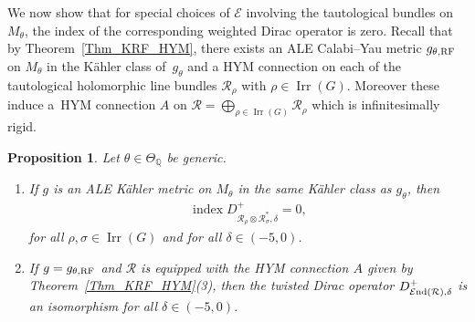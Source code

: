 \documentclass[pdftex]{sigma}
\numberwithin{equation}{section}
\newcommand{\cE}{\mathcal{E}}
\newcommand{\cR}{\mathcal{R}}
\newcommand{\Q}{{\mathbb Q}}
\newcommand{\Irr}{\operatorname{Irr}}
\newcommand{\cEnd}{\cE{\rm nd}}
\newcommand{\ind}{\mathop{\mathrm{index}}}
\newcommand{\RF}{{\rm RF}}
\newtheorem{Proposition}[Theorem]{Proposition}
 { \theoremstyle{definition}
\newtheorem{Definition}[Theorem]{Definition}
\newtheorem{Remark}[Theorem]{Remark} }
\begin{document}
We now show that for special choices of $\cE$ involving the
tautological bundles on $M_\theta$, the index of the corresponding
weighted Dirac operator is zero.  Recall that by Theorem~\ref{Thm_KRF_HYM},
there exists an ALE Calabi--Yau metric $g_{\theta, \RF}$ on $M_\theta$
in the K\"ahler class of~$g_{\theta}$ and a HYM connection on each of
the tautological holomorphic line bundles $\cR_{\rho}$ with $\rho\in
\Irr(G)$.  Moreover these induce a~HYM connection $A$ on $\cR =
\bigoplus_{\rho\in \Irr(G)} \cR_{\rho}$ which is inf\/initesimally
rigid.

\begin{Proposition}\label{prop:mv}
  Let $\theta\in\Theta_\Q$ be generic.
  \begin{enumerate}\itemsep=0pt
  \item[$(1)$] If $g$ is an ALE K\"ahler metric on $M_\theta$ in the same
    K\"ahler class as $g_\theta$, then
    \begin{gather*}%
      \ind D^{+}_{\cR_\rho\otimes \cR_\sigma^*, \delta}=0,
    \end{gather*}
    for all $\rho, \sigma \in \Irr(G)$ and for all $\delta \in (-5,
    0)$.
  \item[$(2)$] If $g=g_{\theta,\RF}$ and $\cR$ is equipped with the HYM
    connection $A$ given by Theorem~{\rm \ref{Thm_KRF_HYM}(3)}, then
    the twisted Dirac operator $D^{+}_{\cEnd(\cR),\delta}$ is an
    isomorphism for all $\delta \in (-5, 0)$.
  \end{enumerate}
\end{Proposition}
\end{document}
